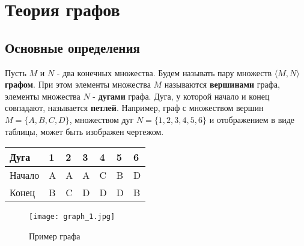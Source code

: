 \chapter{Теория графов}
\section{Основные определения}
Пусть $M$ и $N$ - два конечных множества. Будем называть пару множеств $\langle M, N \rangle$ \textbf{графом}.
При этом элементы множества $M$ называются \textbf{вершинами} графа, элементы множества $N$ - \textbf{дугами} графа. 
Дуга, у которой начало и конец совпадают, называется \textbf{петлей}.
Например, граф с множеством вершин $M = \{A, B, C, D\}$, множеством дуг $N = \{1, 2, 3, 4, 5, 6\}$ и отображением в виде
таблицы, может быть изображен чертежом.

\begin{table}[h]
    \begin{tabular}[c]{ | l | l l l l l l | }
        \hline
        Дуга & 1 & 2 & 3 & 4 & 5 & 6    \\ \hline
        Начало & A & A & A & C & B & D  \\ \hline
        Конец & B & C & D & D & D & B   \\
        \hline
    \end{tabular}
\end{table}

\begin{figure}
    \centering 
    \texttt{[image: graph\_1.jpg]}
    \caption{Пример графа}
\end{figure}
